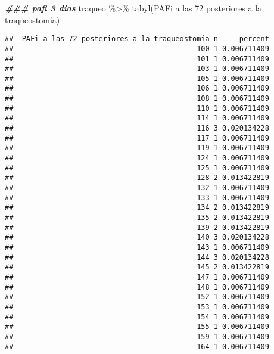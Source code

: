 \documentclass[
]{article}
\newenvironment{Shaded}{\begin{snugshade}}{\end{snugshade}}
\newcommand{\AttributeTok}[1]{\textcolor[rgb]{0.77,0.63,0.00}{#1}}
\newcommand{\DocumentationTok}[1]{\textcolor[rgb]{0.56,0.35,0.01}{\textbf{\textit{#1}}}}
\newcommand{\FunctionTok}[1]{\textcolor[rgb]{0.00,0.00,0.00}{#1}}
\newcommand{\NormalTok}[1]{#1}
\newcommand{\SpecialCharTok}[1]{\textcolor[rgb]{0.00,0.00,0.00}{#1}}
\newcommand{\StringTok}[1]{\textcolor[rgb]{0.31,0.60,0.02}{#1}}
\begin{document}
\begin{Shaded}
\begin{Highlighting}[]
\DocumentationTok{\#\#\# pafi 3 dias}
\NormalTok{traqueo }\SpecialCharTok{\%\textgreater{}\%}
  \FunctionTok{tabyl}\NormalTok{(}\StringTok{\textasciigrave{}}\AttributeTok{PAFi a las 72 posteriores a la traqueostomía}\StringTok{\textasciigrave{}}\NormalTok{)}
\end{Highlighting}
\end{Shaded}

\begin{verbatim}
##  PAFi a las 72 posteriores a la traqueostomía n     percent
##                                           100 1 0.006711409
##                                           101 1 0.006711409
##                                           103 1 0.006711409
##                                           105 1 0.006711409
##                                           106 1 0.006711409
##                                           108 1 0.006711409
##                                           110 1 0.006711409
##                                           114 1 0.006711409
##                                           116 3 0.020134228
##                                           117 1 0.006711409
##                                           119 1 0.006711409
##                                           124 1 0.006711409
##                                           125 1 0.006711409
##                                           128 2 0.013422819
##                                           132 1 0.006711409
##                                           133 1 0.006711409
##                                           134 2 0.013422819
##                                           135 2 0.013422819
##                                           139 2 0.013422819
##                                           140 3 0.020134228
##                                           143 1 0.006711409
##                                           144 3 0.020134228
##                                           145 2 0.013422819
##                                           147 1 0.006711409
##                                           148 1 0.006711409
##                                           152 1 0.006711409
##                                           153 1 0.006711409
##                                           154 1 0.006711409
##                                           155 1 0.006711409
##                                           159 1 0.006711409
##                                           164 1 0.006711409

\end{verbatim}
\end{document}
